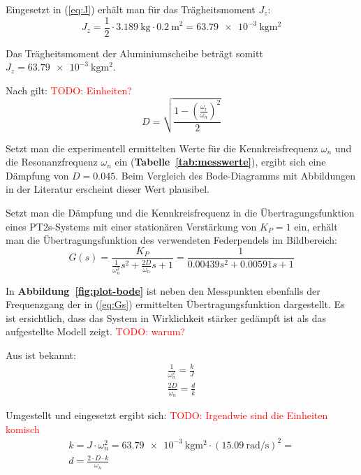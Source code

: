 \documentclass[a4paper,12pt]{scrartcl}
\newcommand{\todo}[1]{\textcolor{red}{TODO: #1}}
\begin{document}
Eingesetzt in (\ref{eq:J}) erhält man für das Trägheitsmoment $J_{z}$:
\begin{equation}
	J_z = \frac{1}{2} \cdot \SI{3.189}{\kilogram} \cdot {\SI{0.2}{\metre}}^2 = \SI{63.79e-3}{\kilogram\square\metre}
\end{equation}

Das Trägheitsmoment der Aluminiumscheibe beträgt somitt $J_{z} = \SI{63.79e-3}{\kilogram\square\metre}$.

Nach \cite{skript} gilt: \todo{Einheiten?}
\begin{equation}
	D = \sqrt{ \frac{1 - \left( \frac{\omega_{r}}{\omega_{n}} \right)^{2}}{2} }
\end{equation}

Setzt man die experimentell ermittelten Werte für die Kennkreisfrequenz $\omega_{n}$ und die Resonanzfrequenz $\omega_{n}$ ein (\textbf{Tabelle~\ref{tab:messwerte}}), ergibt sich eine Dämpfung von $D = 0.045$. Beim Vergleich des Bode-Diagramms mit Abbildungen in der Literatur erscheint dieser Wert plausibel.

Setzt man die Dämpfung und die Kennkreisfrequenz in die Übertragungsfunktion eines PT2s-Systems mit einer stationären Verstärkung von $K_{P} = 1$ ein, erhält man die Übertragungsfunktion des verwendeten Federpendels im Bildbereich:
\begin{equation}
	\label{eq:Gs}
	G \left( s \right) = \frac{K_{P}}{\frac{1}{\omega_{n}^{2}} s^{2} + \frac{2 D}{\omega_{n}} s + 1} = \frac{1}{0.00439 s^{2} + 0.00591 s + 1}
\end{equation}

In \textbf{Abbildung~\ref{fig:plot-bode}} ist neben den Messpunkten ebenfalls der Frequenzgang der in (\ref{eq:Gs}) ermittelten Übertragungsfunktion dargestellt.
Es ist ersichtlich, dass das System in Wirklichkeit stärker gedämpft ist als das aufgestellte Modell zeigt. \todo{warum?}

Aus \cite{skript} ist bekannt:
\begin{gather}
	\frac{1}{\omega_{n}^{2}} = \frac{k}{J} \\
	\frac{2 D}{\omega_{n}} = \frac{d}{k}
\end{gather}

Umgestellt und eingesetzt ergibt sich: \todo{Irgendwie sind die Einheiten komisch}
\begin{gather}
	k = J \cdot \omega_{n}^{2} = \SI{63.79e-3}{\kilogram\square\metre} \cdot \left( \SI{15.09}{\radian\per\second} \right)^{2} = \\
	d = \frac{2 \cdot D \cdot k}{\omega_{n}}
\end{gather}
\end{document}
